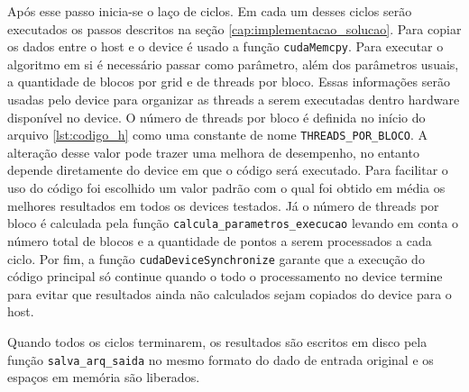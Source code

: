 Após esse passo inicia-se o laço de ciclos. Em cada um desses ciclos serão executados os passos descritos na seção \ref{cap:implementacao_solucao}. Para copiar os dados entre o host e o device é usado a função \texttt{cudaMemcpy}. Para executar o algoritmo em si é necessário passar como parâmetro, além dos parâmetros usuais, a quantidade de blocos por grid e de threads por bloco. Essas informações serão usadas pelo device para organizar as threads a serem executadas dentro hardware disponível no device. O número de threads por bloco é definida no início do arquivo \ref{lst:codigo_h} como uma constante de nome \texttt{THREADS\_POR\_BLOCO}. A alteração desse valor pode trazer uma melhora de desempenho, no entanto depende diretamente do device em que o código será executado. Para facilitar o uso do código foi escolhido um valor padrão com o qual foi obtido em média os melhores resultados em todos os devices testados. Já o número de threads por bloco é calculada pela função \texttt{calcula\_parametros\_execucao} levando em conta o número total de blocos e a quantidade de pontos a serem processados a cada ciclo. Por fim, a função \texttt{cudaDeviceSynchronize} garante que a execução do código principal só continue quando o todo o processamento no device termine para evitar que resultados ainda não calculados sejam copiados do device para o host.

Quando todos os ciclos terminarem, os resultados são escritos em disco pela função \linebreak \texttt{salva\_arq\_saida} no mesmo formato do dado de entrada original e os espaços em memória são liberados.



\renewcommand{\lstlistingname}{Código-Fonte}




